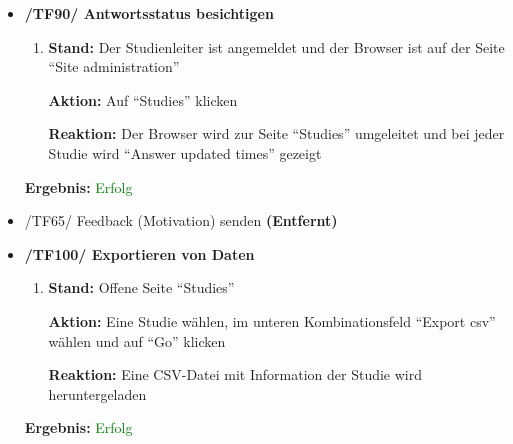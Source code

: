 \documentclass[a4paper]{scrreprt}
\begin{document}
\begin{itemize}
		      
		                      \item \textbf{/TF90/ Antwortsstatus besichtigen}
		                          \begin{enumerate}
		                              \item \par \textbf{Stand: } Der Studienleiter ist angemeldet und der Browser ist auf der Seite ``Site administration''
		                                    \par \textbf{Aktion: }Auf ``Studies'' klicken
		                                    \par \textbf{Reaktion: }Der Browser wird zur Seite ``Studies'' umgeleitet und bei jeder Studie wird ``Answer updated times'' gezeigt
		                          \end{enumerate}		       
		      					\vspace*{0.3cm}
		      		           \par \textbf{Ergebnis: }\textcolor{green}{Erfolg}
		      		           \vspace*{0.6cm} 	
		      		           
		      				\item /TF65/ Feedback (Motivation) senden \textbf{(Entfernt)}	
		      				\vspace*{0.6cm}	
		      				
		                      \item \textbf{/TF100/ Exportieren von Daten}
		                      \begin{enumerate}
		                          \item \par \textbf{Stand: }Offene Seite ``Studies''
		                                \par \textbf{Aktion: }Eine Studie w\"ahlen, im unteren Kombinationsfeld ``Export csv'' w\"ahlen und auf ``Go'' klicken
		                                \par \textbf{Reaktion: }Eine CSV-Datei mit Information der Studie wird heruntergeladen
		                      \end{enumerate}	
		      					\vspace*{0.3cm}
		      		           \par \textbf{Ergebnis: }\textcolor{green}{Erfolg}
		      		           \vspace*{0.6cm}                 			           
		      		           
		      		           \end{itemize} 
	
\end{document}
